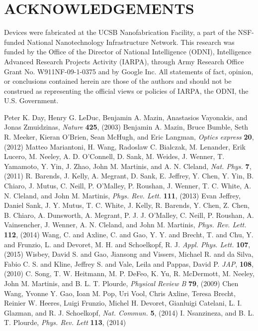 \documentclass[aip,jap,reprint,nobalancelastpage]{revtex4-1}
\begin{document}
\section*{ACKNOWLEDGEMENTS}%
Devices were fabricated at the UCSB Nanofabrication Facility, a part of the NSF-funded National Nanotechnology Infrastructure Network.  This research was funded by the Office of the Director of National Intelligence (ODNI), Intelligence Advanced Research Projects Activity (IARPA), through Army Research Office Grant No. W911NF-09-1-0375 and by Google Inc. All statements of fact, opinion, or conclusions contained herein are those of the authors and should not be construed as representing the official views or policies of IARPA, the ODNI, the U.S. Government.
\begin{thebibliography}{99}

  Peter K. Day,  Henry G. LeDuc,  Benjamin A. Mazin,  Anastasios Vayonakis, and  Jonas Zmuidzinas, \textit{Nature} \textbf{425},  (2003)
  Benjamin A. Mazin,  Bruce Bumble,  Seth R. Meeker,  Kieran O’Brien,  Sean McHugh, and  Eric Langman, \textit{Optics express} \textbf{20},  (2012)
  Matteo Mariantoni, H.  Wang,  Radoslaw C. Bialczak, M.  Lenander,  Erik Lucero, M.  Neeley, A. D.  O’Connell, D.  Sank, M.  Weides, J.  Wenner, T.  Yamamoto, Y.  Yin, J.  Zhao,  John M. Martinis, and A. N.  Cleland, \textit{Nat. Phys.} \textbf{7},  (2011)
 R.  Barends, J.  Kelly, A.  Megrant, D.  Sank, E.  Jeffrey, Y.  Chen, Y.  Yin, B.  Chiaro, J.  Mutus, C.  Neill, P.  O'Malley, P.  Roushan, J.  Wenner, T. C.  White, A. N.  Cleland, and  John M. Martinis, \textit{Phys. Rev. Lett.} \textbf{111},  (2013)
  Evan Jeffrey,  Daniel Sank, J. Y.  Mutus, T. C.  White, J.  Kelly, R.  Barends, Y.  Chen, Z.  Chen, B.  Chiaro, A.  Dunsworth, A.  Megrant, P. J. J.  O'Malley, C.  Neill, P.  Roushan, A.  Vainsencher, J.  Wenner, A. N.  Cleland, and  John M. Martinis, \textit{Phys. Rev. Lett.} \textbf{112},  (2014)
Wang, C. and Axline, C. and Gao, Y. Y. and Brecht, T. and Chu, Y. and Frunzio, L. and Devoret, M. H. and Schoelkopf, R. J. \textit{Appl. Phys. Lett.} \textbf{107},  (2015)
Wisbey, David S. and Gao, Jiansong and Vissers, Michael R. and da Silva, Fabio C. S. and Kline, Jeffrey S. and Vale, Leila and Pappas, David P. \textit{JAP}, \textbf{108},  (2010)
 C.  Song, T. W.  Heitmann, M. P.  DeFeo, K.  Yu, R.  McDermott, M.  Neeley,  John M. Martinis, and B. L. T.  Plourde, \textit{Physical Review B} \textbf{79},  (2009)
  Chen Wang,  Yvonne Y. Gao,  Ioan M. Pop,  Uri Vool,  Chris Axline,  Teresa Brecht,  Reinier W. Heeres,  Luigi Frunzio,  Michel H. Devoret,  Gianluigi Catelani, L. I.  Glazman, and R. J.  Schoelkopf, \textit{Nat. Commun.} \textbf{5},  (2014)
 I.  Nsanzineza, and B. L. T.  Plourde, \textit{Phys. Rev. Lett} \textbf{113},  (2014)


\end{thebibliography}
\end{document}
